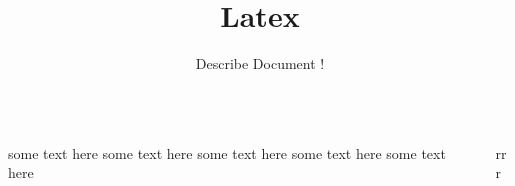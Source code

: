 \documentclass{beamer}
\title{Latex}
\subtitle{Describe Document !}
\begin{document}
	\frame {
		\titlepage
	}
	
	\frame
	{
	\begin{columns}
	\begin{column}{0.5\textwidth}
   	some text here some text here some text here some text here some text here
	\end{column}
	\begin{column}{0.5\textwidth}  %
	  rrr
\end{column}
\end{columns}
}
	
	
	
	
	
\end{document}
